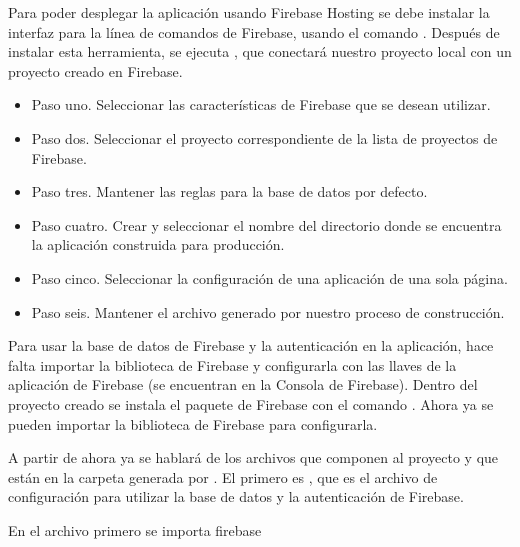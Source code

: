 Para poder desplegar la aplicación usando Firebase Hosting se debe instalar la
interfaz para la línea de comandos de Firebase, usando el comando
. Después de instalar esta herramienta, se ejecuta
, que conectará nuestro proyecto local con un proyecto
creado en Firebase.
\begin{itemize}
\item {} 
Paso uno. Seleccionar las características de Firebase que se desean utilizar.

\item {} 
Paso dos. Seleccionar el proyecto correspondiente de la lista de proyectos de Firebase.

\item {} 
Paso tres. Mantener las reglas para la base de datos por defecto.

\item {} 
Paso cuatro. Crear y seleccionar el nombre del directorio donde se encuentra la aplicación construida para producción.

\item {} 
Paso cinco. Seleccionar la configuración de una aplicación de una sola página.

\item {} 
Paso seis. Mantener el archivo  generado por nuestro proceso de construcción.

\end{itemize}

Para usar la base de datos de Firebase y la autenticación en la aplicación,
hace falta importar la biblioteca de Firebase y configurarla con las llaves
de la aplicación de Firebase (se encuentran en la Consola de Firebase).
Dentro del proyecto creado se instala el paquete de Firebase con el comando
. Ahora ya se pueden importar la biblioteca de Firebase
para configurarla.

A partir de ahora ya se hablará de los archivos que componen al proyecto y
que están en la carpeta  generada por .
El primero es , que es el archivo de configuración para utilizar la
base de datos y la autenticación de Firebase.

En el archivo primero se importa firebase

%
\begin{sphinxVerbatim}[commandchars=\\\{\}]
     
\end{sphinxVerbatim}

